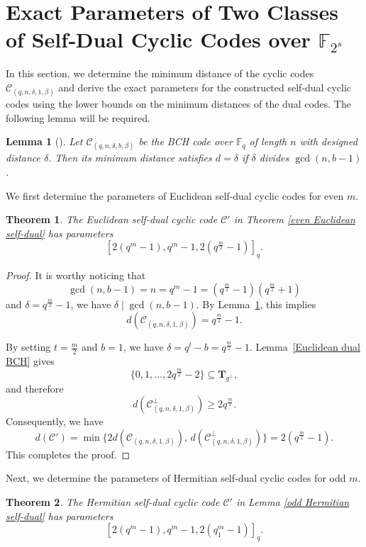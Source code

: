 \documentclass[journal,12pt,onecolumn]{IEEEtran}
\newtheorem{theorem}{Theorem}
\newtheorem{lemma}{Lemma}
\begin{document}
\section{Exact Parameters of Two Classes of Self‑Dual Cyclic Codes over $\mathbb{F}_{2^s}$}
\label{4}
In this section, we determine the minimum distance of the cyclic codes $\mathcal{C}_{(q,n,\delta,1,\beta)}$ and derive the exact parameters for the constructed self-dual cyclic codes using the lower bounds on the minimum distances of the dual codes. The following lemma will be required.

\begin{lemma}[\cite{li2017lcd}]
    \label{weight}
    Let $\mathcal{C}_{(q,n,\delta,b,\beta)}$ be the BCH code over $\mathbb{F}_q$ of length $n$ with designed distance $\delta$. Then its minimum distance satisfies $d=\delta$ if $\delta$ divides $\gcd(n,b-1)$.
\end{lemma}

We first determine the parameters of Euclidean self‑dual cyclic codes for even $m$.
\begin{theorem}
    \label{exact Euclidean}
    The Euclidean self-dual cyclic code $\mathcal{C}'$ in Theorem \ref{even Euclidean self-dual} has parameters \[[2(q^m-1),q^m-1,2(q^\frac{m}{2}-1)]_q.\]
\end{theorem}

\begin{proof}
It is worthy noticing that
\[
\gcd(n, b-1) = n = q^m - 1 = (q^{\frac{m}{2}} - 1)(q^{\frac{m}{2}} + 1)
\]
and $\delta = q^{\frac{m}{2}} - 1$, we have $\delta \mid \gcd(n, b-1)$. By Lemma~\ref{weight}, this implies
\[
d(\mathcal{C}_{(q,n,\delta,1,\beta)}) = q^{\frac{m}{2}} - 1.
\]

By setting $t = \frac{m}{2}$ and $b = 1$, we have $\delta = q^t - b = q^{\frac{m}{2}} - 1$. Lemma~\ref{Euclidean dual BCH} gives
\[
\{0,1,\dots,2q^{\frac{m}{2}} - 2\} \subseteq \mathbf{T}_{g^\perp},
\]
and therefore
\[
d(\mathcal{C}^{\perp}_{(q,n,\delta,1,\beta)}) \ge 2q^{\frac{m}{2}}.
\] Consequently, we have
\[
d(\mathcal{C}') = \min\{2d(\mathcal{C}_{(q,n,\delta,1,\beta)}),\, d(\mathcal{C}^{\perp}_{(q,n,\delta,1,\beta)})\}
= 2(q^{\frac{m}{2}} - 1).
\]
This completes the proof.
\end{proof}

Next, we determine the parameters of Hermitian self-dual cyclic codes for odd $m$.
\begin{theorem}
    \label{Exact Hermitian}
    The Hermitian self-dual cyclic code $\mathcal{C}'$ in Lemma \ref{odd Hermitian self-dual} has parameters \[[2(q^m-1),q^m-1,2(q_1^m-1)]_q.\]
\end{theorem}
\end{document}
